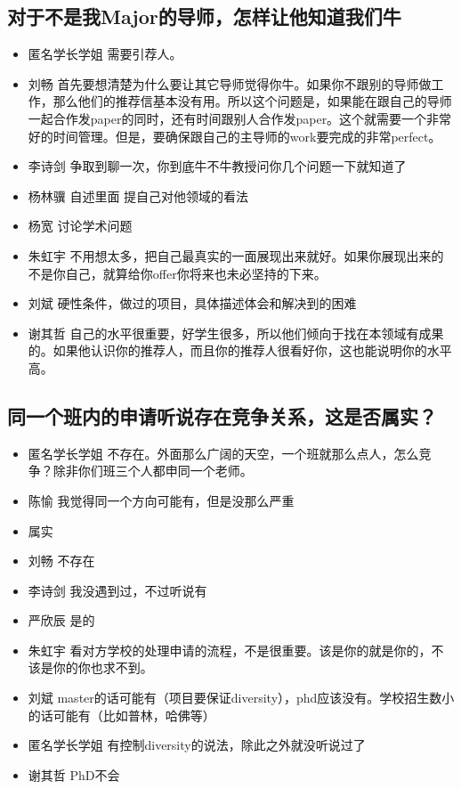 \documentclass{vivid_layout}
\begin{document}
\subsection{对于不是我Major的导师，怎样让他知道我们牛}
\begin{itemize}
\item   {\name 匿名学长学姐}  \quad  需要引荐人。
\item  { 刘畅}  \quad 首先要想清楚为什么要让其它导师觉得你牛。如果你不跟别的导师做工作，那么他们的推荐信基本没有用。所以这个问题是，如果能在跟自己的导师一起合作发paper的同时，还有时间跟别人合作发paper。这个就需要一个非常好的时间管理。但是，要确保跟自己的主导师的work要完成的非常perfect。
\item  { 李诗剑}  \quad 争取到聊一次，你到底牛不牛教授问你几个问题一下就知道了
\item  { 杨林骥}  \quad 自述里面 提自己对他领域的看法
\item  { 杨宽}  \quad 讨论学术问题
\item  { 朱虹宇}  \quad 不用想太多，把自己最真实的一面展现出来就好。如果你展现出来的不是你自己，就算给你offer你将来也未必坚持的下来。
\item  { 刘斌}  \quad 硬性条件，做过的项目，具体描述体会和解决到的困难
\item  { 谢其哲}  \quad 自己的水平很重要，好学生很多，所以他们倾向于找在本领域有成果的。如果他认识你的推荐人，而且你的推荐人很看好你，这也能说明你的水平高。
\end{itemize}

\subsection{同一个班内的申请听说存在竞争关系，这是否属实？ }
\begin{itemize}
\item   {\name 匿名学长学姐}  \quad 不存在。外面那么广阔的天空，一个班就那么点人，怎么竞争？除非你们班三个人都申同一个老师。
\item  { 陈愉}  \quad 我觉得同一个方向可能有，但是没那么严重
\item 属实
\item  { 刘畅}  \quad 不存在
\item  { 李诗剑}  \quad 我没遇到过，不过听说有
\item  { 严欣辰}  \quad 是的
\item  { 朱虹宇}  \quad 看对方学校的处理申请的流程，不是很重要。该是你的就是你的，不该是你的你也求不到。
\item  { 刘斌}  \quad master的话可能有（项目要保证diversity），phd应该没有。学校招生数小的话可能有（比如普林，哈佛等）
\item   {\name 匿名学长学姐}  \quad 有控制diversity的说法，除此之外就没听说过了
\item  { 谢其哲}  \quad PhD不会
\end{itemize}
\end{document}
